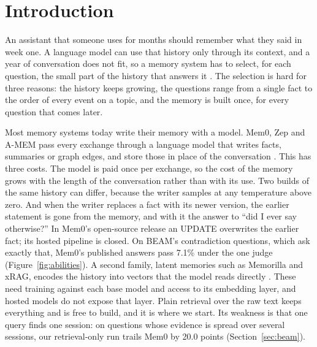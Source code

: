 \section{Introduction}
\label{sec:intro}

An assistant that someone uses for months should remember what they said in week one. A language model can use that history only through its context, and a year of conversation does not fit, so a memory system has to select, for each question, the small part of the history that answers it \citep{packer2023memgpt,park2023generative}. The selection is hard for three reasons: the history keeps growing, the questions range from a single fact to the order of every event on a topic, and the memory is built once, for every question that comes later.

Most memory systems today write their memory with a model. Mem0, Zep and A-MEM pass every exchange through a language model that writes facts, summaries or graph edges, and store those in place of the conversation \citep{chhikara2025mem0,rasmussen2025zep,xu2025amem}. This has three costs. The model is paid once per exchange, so the cost of the memory grows with the length of the conversation rather than with its use. Two builds of the same history can differ, because the writer samples at any temperature above zero. And when the writer replaces a fact with its newer version, the earlier statement is gone from the memory, and with it the answer to ``did I ever say otherwise?'' In Mem0's open-source release an UPDATE overwrites the earlier fact; its hosted pipeline is closed. On BEAM's contradiction questions, which ask exactly that, Mem0's published answers pass 7.1\% under the one judge (Figure~\ref{fig:abilities}). A second family, latent memories such as Memorilla and xRAG, encodes the history into vectors that the model reads directly \citep{fallahpour2026memorilla,cheng2024xrag}. These need training against each base model and access to its embedding layer, and hosted models do not expose that layer. Plain retrieval over the raw text keeps everything and is free to build, and it is where we start. Its weakness is that one query finds one session: on questions whose evidence is spread over several sessions, our retrieval-only run trails Mem0 by 20.0 points (Section~\ref{sec:beam}).

